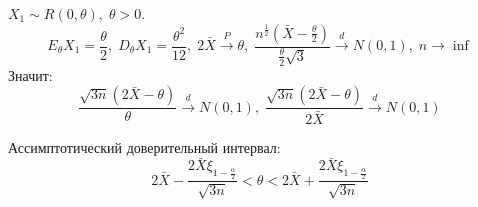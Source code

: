 \begin{example}
$ X_1 \sim R(0, \theta), \; \theta > 0 $. 
$$ E_{\theta}X_1 = \dfrac{\theta}{2}, \; D_{\theta}X_1 = \dfrac{\theta^2}{12}, \; 2\bar{X} \stackrel{P}{\to} \theta, \; \dfrac{n^{\frac{1}{2}}(\bar{X}-\frac{\theta}{2})}{\frac{\theta}{2}\sqrt{3}} \stackrel{d}{\to} N(0, 1), \; n \to \inf$$ 
Значит: 
$$ \dfrac{\sqrt{3n}(2\bar{X} - \theta)}{\theta} \stackrel{d}{\to} N(0, 1), \; \dfrac{\sqrt{3n}(2\bar{X} - \theta)}{2\bar{X}} \stackrel{d}{\to} N(0, 1)$$

Ассимптотический доверительный интервал:
$$ 2\bar{X} - \dfrac{2\bar{X}\xi_{1 - \frac{\alpha}{2}}}{\sqrt{3n}} < \theta <  2\bar{X} + \dfrac{2\bar{X}\xi_{1 - \frac{\alpha}{2}}}{\sqrt{3n}}$$
\end{example}



































